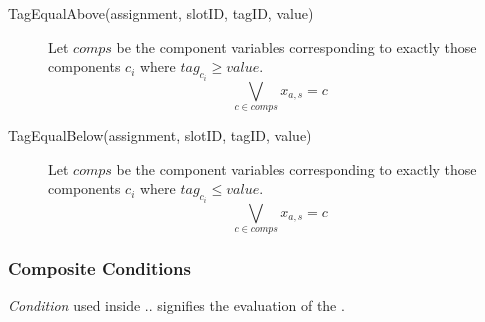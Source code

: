 \begin{description}
\item[TagEqualAbove(assignment, slotID, tagID, value)]	
Let $comps$ be the component variables corresponding to exactly those components $c_i$ where $tag_{c_i} \geq value$.
$$ \bigvee_{c\in comps} x_{a,s} = c$$


\item[TagEqualBelow(assignment, slotID, tagID, value)]	
Let $comps$ be the component variables corresponding to exactly those components $c_i$ where $tag_{c_i} \leq value$.
$$ \bigvee_{c\in comps} x_{a,s} = c$$



\end{description}


\subsubsection{Composite Conditions}

\textit{Condition} used inside .. signifies the evaluation of the .

